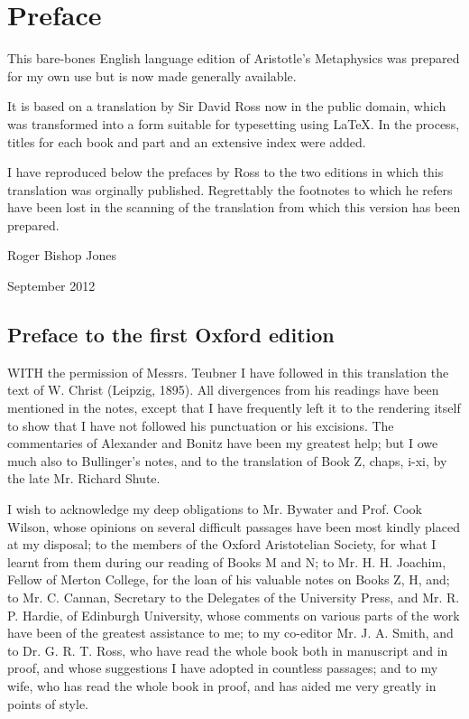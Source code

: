 \renewcommand{\aref}{Book \arabic{chapter} Part \arabic{section}}

\pagebreak

\chapter*{Preface}

This bare-bones English language edition of Aristotle's Metaphysics was prepared for my own use but is now made generally available.

It is based on a translation by Sir David Ross now in the public domain, which was transformed into a form suitable for typesetting using {\LaTeX}.
In the process, titles for each book and part and an extensive index were added.

I have reproduced below the prefaces by Ross to the two editions in which this translation was orginally published.
Regrettably the footnotes to which he refers have been lost in the scanning of the translation from which this version has been prepared.


\vspace{0.5in} 

Roger Bishop Jones

\vspace{0.05in} 

September 2012

\section*{Preface to the first Oxford edition} 

WITH the permission of Messrs. Teubner I have followed in 
this translation the text of W. Christ (Leipzig, 1895). All 
divergences from his readings have been mentioned in the 
notes, except that I have frequently left it to the rendering 
itself to show that I have not followed his punctuation or his 
excisions. The commentaries of Alexander and Bonitz have 
been my greatest help; but I owe much also to Bullinger's 
notes, and to the translation of Book Z, chaps, i-xi, by 
the late Mr. Richard Shute. 

I wish to acknowledge my deep obligations to Mr. Bywater 
and Prof. Cook Wilson, whose opinions on several difficult passages
have been most kindly placed at my disposal; to the members
of the Oxford Aristotelian Society, for what I learnt from 
them during our reading of Books M and N; to Mr. H. H. 
Joachim, Fellow of Merton College, for the loan of his valuable 
notes on Books Z, H, and; to Mr. C. Cannan, Secretary to 
the Delegates of the University Press, and Mr. R. P. Hardie, of 
Edinburgh University, whose comments on various parts of 
the work have been of the greatest assistance to me; to my 
co-editor Mr. J. A. Smith, and to Dr. G. R. T. Ross, who have 
read the whole book both in manuscript and in proof, and 
whose suggestions I have adopted in countless passages; and 
to my wife, who has read the whole book in proof, and has 
aided me very greatly in points of style. 

